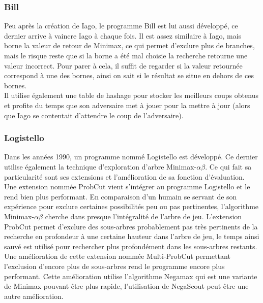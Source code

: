 \documentclass[10pt,a4paper]{article}
\begin{document}
\subsubsection{Bill}

Peu après la création de Iago, le programme Bill\cite{LM86} est lui aussi développé, ce dernier arrive à vaincre Iago à chaque fois. Il est assez similaire à Iago, mais borne la valeur de retour de Minimax, ce qui permet d'exclure plus de branches, mais le risque reste que si la borne a été mal choisie la recherche retourne une valeur incorrect. Pour parer à cela, il suffit de regarder si la valeur retournée correspond à une des bornes, ainsi on sait si le résultat se situe en dehors de ces bornes.\\

Il utilise également une table de hashage pour stocker les meilleurs coups obtenus et profite du temps que son adversaire met à jouer pour la mettre à jour (alors que Iago se contentait d'attendre le coup de l'adversaire).

\subsubsection{Logistello}

Dans les années 1990, un programme nommé Logistello\cite{Bur95a} est développé. Ce dernier utilise également la technique d'exploration d'arbre Minimax-$\alpha\beta$. Ce qui fait sa particularité sont ses extensions et l'amélioration de sa fonction d'évaluation.\\

Une extension nommée ProbCut\cite{Bur95b} vient s'intégrer au programme Logistello et le rend bien plus performant. En comparaison d'un humain se servant de son expérience pour exclure certaines possibilités peu ou pas pertinentes, l'algorithme Minimax-$\alpha\beta$ cherche dans presque l'intégralité de l'arbre de jeu. L'extension ProbCut permet d'exclure des sous-arbres probablement pas très pertinents de la recherche en profondeur à une certaine hauteur dans l'arbre de jeu, le temps ainsi sauvé est utilisé pour rechercher plus profondément dans les sous-arbres restants.\\

Une amélioration de cette extension nommée Multi-ProbCut\cite{Bur97a} permettant l'exclusion d'encore plus de sous-arbres rend le programme encore plus performant. Cette amélioration utilise l'algorithme Negamax qui est une variante de Minimax pouvant être plus rapide, l'utilisation de NegaScout peut être une autre amélioration.\\
\end{document}
